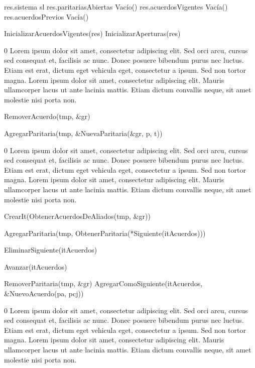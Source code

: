 {
	\state res.sistema \asig sl						
	\state res.paritariasAbiertas \asig Vacío()		
	\state res.acuerdosVigentes \asig Vacía()		
	\state res.acuerdosPrevios \asig Vacía()		
	\state

	\state InicializarAcuerdosVigentes(res)			
	\state InicializarAperturas(res)				
}
{0}
{Lorem ipsum dolor sit amet, consectetur adipiscing elit. Sed orci arcu, cursus sed consequat et, facilisis ac nunc. Donec posuere bibendum purus nec luctus. Etiam est erat, dictum eget vehicula eget, consectetur a ipsum. Sed non tortor magna. Lorem ipsum dolor sit amet, consectetur adipiscing elit. Mauris ullamcorper lacus ut ante lacinia mattis. Etiam dictum convallis neque, sit amet molestie nisi porta non.}

{
							
		\state RemoverAcuerdo(tmp, \&gr)							
	\endif
	\state

	\state AgregarParitaria(tmp, \&NuevaParitaria(\&gr, p, t))		
}
{0}
{Lorem ipsum dolor sit amet, consectetur adipiscing elit. Sed orci arcu, cursus sed consequat et, facilisis ac nunc. Donec posuere bibendum purus nec luctus. Etiam est erat, dictum eget vehicula eget, consectetur a ipsum. Sed non tortor magna. Lorem ipsum dolor sit amet, consectetur adipiscing elit. Mauris ullamcorper lacus ut ante lacinia mattis. Etiam dictum convallis neque, sit amet molestie nisi porta non.}

{

	\state {} \asig CrearIt(ObtenerAcuerdosDeAliados(tmp, \&gr))		
			
		\state

		\state AgregarParitaria(tmp, ObtenerParitaria(*Siguiente(itAcuerdos)))		

		\state EliminarSiguiente(itAcuerdos)										

		\state
		\state Avanzar(itAcuerdos)													
	\endwhile
	\state

	\state {} \asig RemoverParitaria(tmp, \&gr)		
	\state AgregarComoSiguiente(itAcuerdos, \&NuevoAcuerdo(pa, pcj))			
}
{0}
{Lorem ipsum dolor sit amet, consectetur adipiscing elit. Sed orci arcu, cursus sed consequat et, facilisis ac nunc. Donec posuere bibendum purus nec luctus. Etiam est erat, dictum eget vehicula eget, consectetur a ipsum. Sed non tortor magna. Lorem ipsum dolor sit amet, consectetur adipiscing elit. Mauris ullamcorper lacus ut ante lacinia mattis. Etiam dictum convallis neque, sit amet molestie nisi porta non.}

